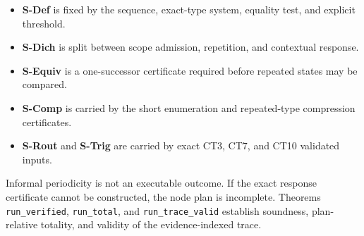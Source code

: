 \documentclass[
  11pt,
]{article}
\providecommand{\tightlist}{%
  \setlength{\itemsep}{0pt}\setlength{\parskip}{0pt}}
\theoremstyle{definition}
\begin{document}
\begin{itemize}
\tightlist
\item \textbf{S-Def} is fixed by the sequence, exact-type system, equality test, and explicit threshold.
\item \textbf{S-Dich} is split between scope admission, repetition, and contextual response.
\item \textbf{S-Equiv} is a one-successor certificate required before repeated states may be compared.
\item \textbf{S-Comp} is carried by the short enumeration and repeated-type compression certificates.
\item \textbf{S-Rout} and \textbf{S-Trig} are carried by exact CT3, CT7, and CT10 validated inputs.
\end{itemize}

Informal periodicity is not an executable outcome.  If the exact response
certificate cannot be constructed, the node plan is incomplete.  Theorems
\texttt{run\_verified}, \texttt{run\_total}, and
\texttt{run\_trace\_valid} establish soundness, plan-relative totality, and
validity of the evidence-indexed trace.
\end{document}
